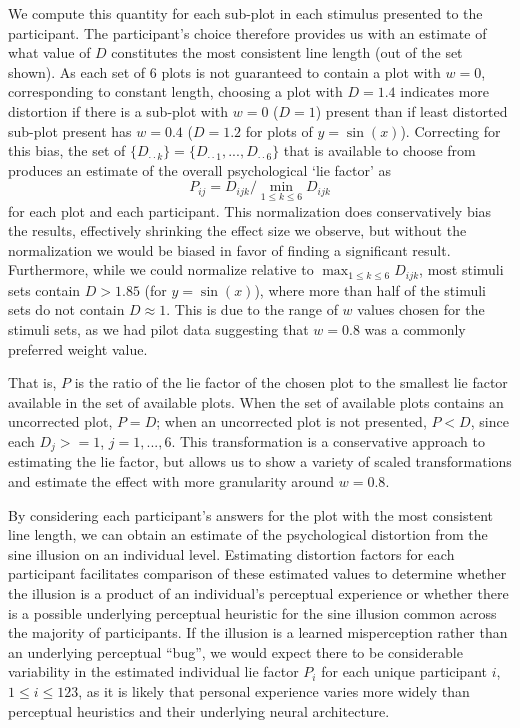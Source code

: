 \documentclass[11pt]{isuthesis}\usepackage[]{graphicx}\usepackage[]{color}
\begin{document}
We compute this quantity for each sub-plot in each stimulus presented to the participant. The participant's choice therefore provides us with an estimate of what value of $D$ constitutes the most consistent line length (out of the set shown). As each set of 6 plots is not guaranteed to contain a plot with $w=0$,  corresponding to constant length, choosing a plot with $D=1.4$ indicates more distortion if there is a sub-plot with $w=0$ ($D=1$) present than if least distorted sub-plot present has $w=0.4$ ($D=1.2$ for plots of $y=\sin(x)$). Correcting for this bias, the set of $\{D_{\cdot \cdot k}\}=\{D_{\cdot \cdot 1}, ..., D_{\cdot \cdot 6}\}$ that is available to choose from produces an estimate of the overall  psychological `lie factor' as 
\begin{equation}\label{eqn:pconv}
P_{ij}=D_{ijk}/\min_{1\leq k \leq 6} D_{ijk}
\end{equation}
for each plot and each participant. This normalization does conservatively bias the results, effectively shrinking the effect size we observe, but without the normalization we would be biased in favor of finding a significant result. Furthermore, while we could normalize relative to $\max_{1\leq k \leq 6}D_{ijk}$, most stimuli sets contain $D > 1.85$ (for $y=\sin(x)$), where more than half of the stimuli sets do not contain $D\approx 1$. This is due to the range of $w$ values chosen for the stimuli sets, as we had pilot data suggesting that $w=0.8$ was a commonly preferred weight value. 

That is, $P$ is the ratio of the lie factor of the chosen plot to the smallest lie factor available in the set of available plots. When the set of available plots contains an uncorrected plot, $P = D$; when an uncorrected plot is not presented, $P < D$, since each $D_j >= 1$, $j=1, ..., 6$. This transformation is a conservative approach to estimating the lie factor, but allows us to show a variety of scaled transformations and estimate the effect with more granularity around $w=0.8$. 

By considering each participant's answers for the plot with the most consistent line length, we can obtain an estimate of the psychological distortion from the sine illusion on an individual level. Estimating distortion factors for each participant facilitates comparison of these estimated values to determine whether the illusion is a product of an individual's perceptual experience or whether there is a possible underlying perceptual heuristic for the sine illusion common across the majority of participants. If the illusion is a learned misperception rather than an underlying perceptual ``bug'', we would expect there to be considerable variability in the estimated individual lie factor $P_i$  for each unique participant $i$, $1\leq i \leq 123$, as it is likely that personal experience varies more widely than perceptual heuristics and their underlying neural architecture. 
\end{document}
